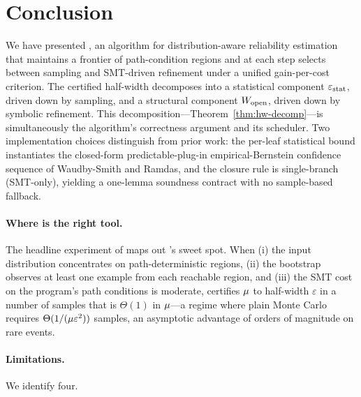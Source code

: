 \section{Conclusion}\label{sec:conclusion}

We have presented \toolname{}, an algorithm for distribution-aware
reliability estimation that maintains a frontier of path-condition
regions and at each step selects between sampling and SMT-driven
refinement under a unified gain-per-cost criterion.  The certified
half-width decomposes into a statistical component $\varepsilon_{\mathrm{stat}}$, driven
down by sampling, and a structural component $W_{\mathrm{open}}$, driven down
by symbolic refinement.  This decomposition---Theorem~\ref{thm:hw-decomp}---is
simultaneously the algorithm's correctness argument and its scheduler.
Two implementation choices distinguish \toolname{} from prior work:
the per-leaf statistical bound instantiates the closed-form
predictable-plug-in empirical-Bernstein confidence sequence of
Waudby-Smith and Ramdas, and the closure rule is single-branch
(SMT-only), yielding a one-lemma soundness contract with no
sample-based fallback.

\paragraph{Where \toolname{} is the right tool.}
The headline experiment of  maps out
\toolname{}'s sweet spot.  When (i) the input distribution
concentrates on path-deterministic regions, (ii) the bootstrap
observes at least one example from each reachable region, and (iii)
the SMT cost on the program's path conditions is moderate, \toolname{}
certifies $\mu$ to half-width $\varepsilon$ in a number of samples
that is $\Theta(1)$ in $\mu$---a regime where plain Monte Carlo
requires $\Theta(1/(\mu\varepsilon^2))$ samples, an asymptotic
advantage of orders of magnitude on rare events.

\paragraph{Limitations.}
We identify four.


